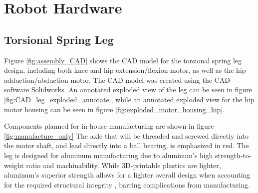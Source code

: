 \section{Robot Hardware}
\label{sec:robot_hardware}

\subsection{Torsional Spring Leg}
\label{sec:torsional_spring_leg}

Figure \ref{fig:assembly_CAD} shows the CAD model for the torsional spring leg design, including both knee and hip extension/flexion motor, as well as the hip adduction/abduction motor. The CAD model was created using the CAD software Solidworks. An annotated exploded view of the leg can be seen in figure \ref{fig:CAD_leg_exploded_annotate}, while an annotated exploded view for the hip motor housing can be seen in figure \ref{fig:exploded_motor_housing_hip}. 

Components planned for in-house manufacturing are shown in figure \ref{fig:manufacture_only} The axle that will be 
threaded and screwed directly into the motor shaft, and lead directly into a ball bearing, is emphasized in red. The leg is designed for aluminum manufacturing due to aluminum's high strength-to-weight ratio and machinability. While 3D-printable plastics are lighter, aluminum's superior strength allows for a lighter overall design when accounting for the required structural integrity \cite{Aluminum} \cite{PLA}, barring complications from manufacturing.

